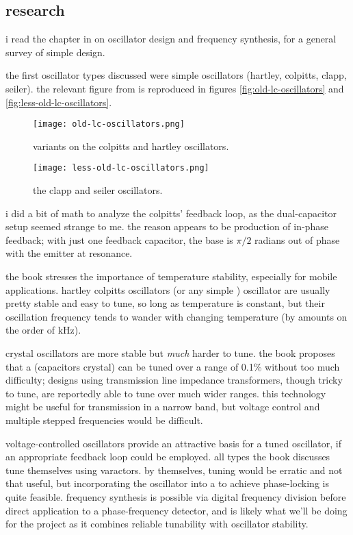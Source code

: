 \subsection*{research}
i read the chapter in \autocite{experimental-rf} on oscillator design and
frequency synthesis, for a general survey of simple \vco design.

the first oscillator types discussed were simple \lc oscillators (hartley,
colpitts, clapp, seiler). the relevant figure from \autocite{experimental-rf}
is reproduced in figures \ref{fig:old-lc-oscillators} and
\ref{fig:less-old-lc-oscillators}.

\begin{figure}[H]
	\centering
	\texttt{[image: old-lc-oscillators.png]}
	\caption{variants on the colpitts and hartley oscillators.}
	\label{fig:lc-oscillators}
\end{figure}

\begin{figure}[H]
	\centering
	\texttt{[image: less-old-lc-oscillators.png]}
	\caption{the clapp and seiler oscillators.}
	\label{fig:lc-oscillators}
\end{figure}

i did a bit of math to analyze the colpitts' feedback loop, as the
dual-capacitor setup seemed strange to me. the reason appears to be production
of in-phase feedback; with just one feedback capacitor, the base is \(\pi/2\)
radians out of phase with the emitter at resonance.

the book stresses the importance of temperature stability, especially for
mobile applications. hartley \amp colpitts oscillators (or any simple \lc)
oscillator are usually pretty stable and easy to tune, so long as temperature
is constant, but their oscillation frequency tends to wander with changing
temperature (by amounts on the order of kHz).

crystal oscillators are more stable but \emph{much} harder to tune. the book
proposes that a \vxo (capacitors \amp crystal) can be tuned over a range of
0.1\% without too much difficulty; designs using transmission line impedance
transformers, though tricky to tune, are reportedly able to tune over much
wider ranges. this technology might be useful for \fm transmission in a narrow
band, but voltage control and multiple stepped frequencies would be difficult.

voltage-controlled \lc oscillators provide an attractive basis for a tuned
oscillator, if an appropriate feedback loop could be employed. all types the
book discusses tune themselves using varactors. by themselves, tuning would be
erratic and not that useful, but incorporating the oscillator into a \pll to
achieve phase-locking is quite feasible. frequency synthesis is possible via
digital frequency division before direct application to a phase-frequency
detector, and is likely what we'll be doing for the project as it combines
reliable tunability with oscillator stability.

